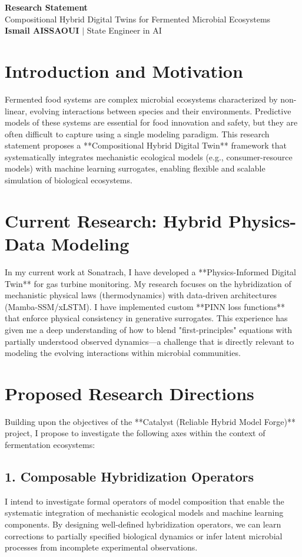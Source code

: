 \documentclass[a4paper,11pt]{article}
\begin{document}
\begin{center}
    {\LARGE\bfseries\color{titleblue} Research Statement}\\[6pt]
    {\large Compositional Hybrid Digital Twins for Fermented Microbial Ecosystems}\\[4pt]
    \textbf{Ismail AISSAOUI} $|$ State Engineer in AI
\end{center}

\bigskip

\section{Introduction and Motivation}
Fermented food systems are complex microbial ecosystems characterized by non-linear, evolving interactions between species and their environments. Predictive models of these systems are essential for food innovation and safety, but they are often difficult to capture using a single modeling paradigm. This research statement proposes a **Compositional Hybrid Digital Twin** framework that systematically integrates mechanistic ecological models (e.g., consumer-resource models) with machine learning surrogates, enabling flexible and scalable simulation of biological ecosystems.

\section{Current Research: Hybrid Physics-Data Modeling}
In my current work at Sonatrach, I have developed a **Physics-Informed Digital Twin** for gas turbine monitoring. My research focuses on the hybridization of mechanistic physical laws (thermodynamics) with data-driven architectures (Mamba-SSM/xLSTM). I have implemented custom **PINN loss functions** that enforce physical consistency in generative surrogates. This experience has given me a deep understanding of how to blend "first-principles" equations with partially understood observed dynamics—a challenge that is directly relevant to modeling the evolving interactions within microbial communities.

\section{Proposed Research Directions}
Building upon the objectives of the **Catalyst (Reliable Hybrid Model Forge)** project, I propose to investigate the following axes within the context of fermentation ecosystems:

\subsection{1. Composable Hybridization Operators}
I intend to investigate formal operators of model composition that enable the systematic integration of mechanistic ecological models and machine learning components. By designing well-defined hybridization operators, we can learn corrections to partially specified biological dynamics or infer latent microbial processes from incomplete experimental observations.
\end{document}
